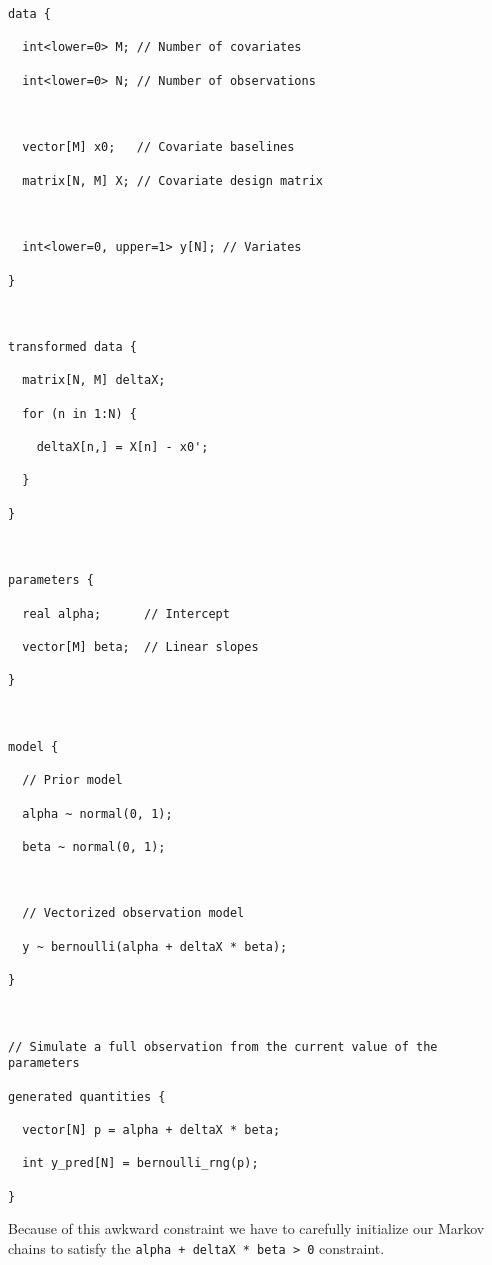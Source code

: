 \documentclass[
  letterpaper,
  DIV=11,
  numbers=noendperiod]{scrartcl}
\begin{document}
\begin{verbatim}
data {

  int<lower=0> M; // Number of covariates

  int<lower=0> N; // Number of observations

  

  vector[M] x0;   // Covariate baselines

  matrix[N, M] X; // Covariate design matrix

  

  int<lower=0, upper=1> y[N]; // Variates

}



transformed data {

  matrix[N, M] deltaX;

  for (n in 1:N) {

    deltaX[n,] = X[n] - x0';

  }

}



parameters {

  real alpha;      // Intercept

  vector[M] beta;  // Linear slopes

}



model {

  // Prior model

  alpha ~ normal(0, 1);

  beta ~ normal(0, 1);



  // Vectorized observation model

  y ~ bernoulli(alpha + deltaX * beta);

}



// Simulate a full observation from the current value of the parameters

generated quantities {

  vector[N] p = alpha + deltaX * beta;

  int y_pred[N] = bernoulli_rng(p);

}
\end{verbatim}

Because of this awkward constraint we have to carefully initialize our
Markov chains to satisfy the
\texttt{alpha\ +\ deltaX\ *\ beta\ \textgreater{}\ 0} constraint.
\end{document}
